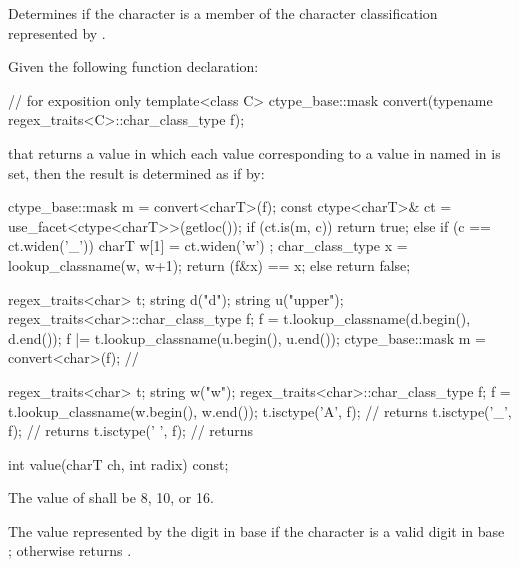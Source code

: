 \begin{itemdescr}
\pnum
\effects  Determines if the character  is a member of the character
classification represented by .

\pnum
\returns Given the following function declaration:
\begin{codeblock}
// for exposition only
template<class C>
  ctype_base::mask convert(typename regex_traits<C>::char_class_type f);
\end{codeblock}
that returns a value in which each  value corresponding to
a value in  named in  is set, then the
result is determined as if by:
\begin{codeblock}
ctype_base::mask m = convert<charT>(f);
const ctype<charT>& ct = use_facet<ctype<charT>>(getloc());
if (ct.is(m, c)) {
  return true;
} else if (c == ct.widen('_')) {
  charT w[1] = { ct.widen('w') };
  char_class_type x = lookup_classname(w, w+1);
  return (f&x) == x;
} else {
  return false;
}
\end{codeblock}
\begin{example}
\begin{codeblock}
regex_traits<char> t;
string d("d");
string u("upper");
regex_traits<char>::char_class_type f;
f = t.lookup_classname(d.begin(), d.end());
f |= t.lookup_classname(u.begin(), u.end());
ctype_base::mask m = convert<char>(f); // 
\end{codeblock}
\end{example}
\begin{example}
\begin{codeblock}
regex_traits<char> t;
string w("w");
regex_traits<char>::char_class_type f;
f = t.lookup_classname(w.begin(), w.end());
t.isctype('A', f); // returns 
t.isctype('_', f); // returns 
t.isctype(' ', f); // returns 
\end{codeblock}
\end{example}

\end{itemdescr}

%
\begin{itemdecl}
int value(charT ch, int radix) const;
\end{itemdecl}

\begin{itemdescr}
\pnum
\requires  The value of  shall be 8, 10, or 16.

\pnum
\returns The value represented by the digit  in base
 if the character  is a valid digit in base
; otherwise returns .
\end{itemdescr}

